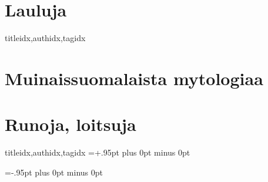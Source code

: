 \documentclass[twoside,10pt]{book}
\newcommand{\defaultlyricfont}{\sffamily\large} %
\renewcommand{\lyricfont}{\defaultlyricfont} %
\begin{document}
  \clearpage\scleardpage
    \begin{otherlanguage}{finnish} %
      \section{Lauluja}
        \begin{songs}{titleidx,authidx,tagidx}
          \setcounter{songnum}{600}
          
          
        \end{songs}
      \clearpage\scleardpage
      \section{Muinaissuomalaista mytologiaa}
        
      \clearpage\scleardpage
      \section{Runoja, loitsuja}
        \begin{songs}{titleidx,authidx,tagidx}
          \setcounter{songnum}{700}
          \chordsoff %
          \baselineadj=+.95pt plus 0pt minus 0pt %
          \renewcommand{\lyricfont}{\small} %
          
          \renewcommand{\lyricfont}{\defaultlyricfont} %
          \baselineadj=-.95pt plus 0pt minus 0pt %
          \chordson %
        \end{songs}
    \end{otherlanguage}

  \clearpage%
    

  \clearpage
\end{document}
